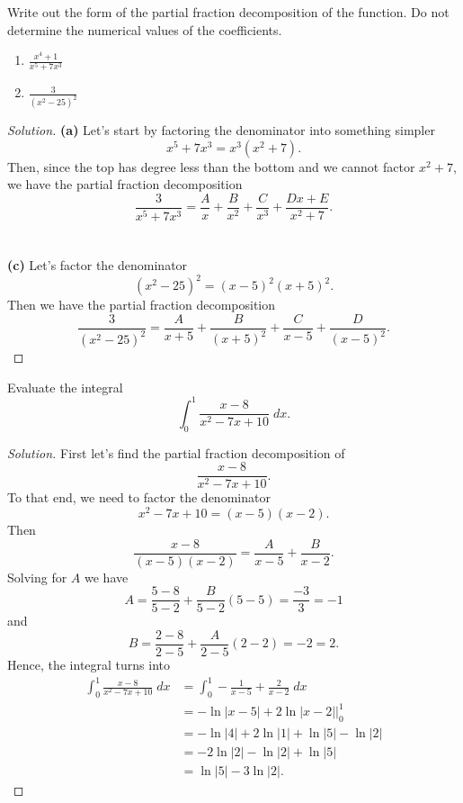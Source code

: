 \begin{problem}[WebAssign, HW 13, \# 2]
Write out the form of the partial fraction decomposition of the
function. Do not determine the numerical values of the coefficients.
\begin{enumerate}[label=(\alph*)]
\item $\displaystyle\frac{x^4+1}{x^5+7x^3}$
\item $\displaystyle\frac{3}{(x^2-25)^2}$
\end{enumerate}
\end{problem}
\begin{proof}[Solution]
\textbf{(a)} Let's start by factoring the denominator into something
simpler
\[
x^5+7x^3=x^3(x^2+7).
\]
Then, since the top has degree less than the bottom and we cannot factor
$x^2+7$, we have the partial fraction decomposition
\[
\frac{3}{x^5+7x^3}=
\boxed{\frac{A}{x}+\frac{B}{x^2}+\frac{C}{x^3}+\frac{Dx+E}{x^2+7}.}
\]
\\\\
\textbf{(c)} Let's factor the denominator
\[
\left(x^2-25\right)^2=(x-5)^2(x+5)^2.
\]
Then we have the partial fraction decomposition
\[
\frac{3}{\left(x^2-25\right)^2}=
\boxed{\frac{A}{x+5}+\frac{B}{(x+5)^2}+\frac{C}{x-5}+\frac{D}{(x-5)^2}.}
\]
\end{proof}
\begin{problem}[WebAssign, HW 13, \# 3]
Evaluate the integral
\[
\int_0^1\frac{x-8}{x^2-7x+10}\;dx.
\]
\end{problem}
\begin{proof}[Solution]
First let's find the partial fraction decomposition of
\[
\frac{x-8}{x^2-7x+10}.
\]
To that end, we need to factor the denominator
\[
x^2-7x+10=(x-5)(x-2).
\]
Then
\[
\frac{x-8}{(x-5)(x-2)}=\frac{A}{x-5}+\frac{B}{x-2}.
\]
Solving for $A$ we have
\[
A=\frac{5-8}{5-2}+\frac{B}{5-2}(5-5)=\frac{-3}{3}=-1
\]
and
\[
B=\frac{2-8}{2-5}+\frac{A}{2-5}(2-2)=-2=2.
\]
Hence, the integral turns into
\begin{align*}
\int_0^1\frac{x-8}{x^2-7x+10}\;dx
&=\int_0^1-\frac{1}{x-5}+\frac{2}{x-2}\;dx\\
&=\left.-\ln|x-5|+2\ln|x-2|\right|_0^1\\
&=-\ln|4|+2\ln|1|+\ln|5|-\ln|2|\\
&=-2\ln|2|-\ln|2|+\ln|5|\\
&=\boxed{\ln|5|-3\ln|2|.}
\end{align*}
\end{proof}

